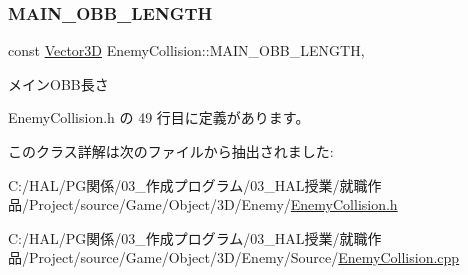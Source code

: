 \subsubsection{\texorpdfstring{M\+A\+I\+N\+\_\+\+O\+B\+B\+\_\+\+L\+E\+N\+G\+TH}{MAIN\_OBB\_LENGTH}}
{\footnotesize\ttfamily const \mbox{\hyperlink{class_vector3_d}{Vector3D}} Enemy\+Collision\+::\+M\+A\+I\+N\+\_\+\+O\+B\+B\+\_\+\+L\+E\+N\+G\+TH\hspace{0.3cm}{\ttfamily [static]}, {\ttfamily [private]}}



メイン\+O\+B\+B長さ 



 Enemy\+Collision.\+h の 49 行目に定義があります。



このクラス詳解は次のファイルから抽出されました\+:\begin{DoxyCompactItemize}
\item 
C\+:/\+H\+A\+L/\+P\+G関係/03\+\_\+作成プログラム/03\+\_\+\+H\+A\+L授業/就職作品/\+Project/source/\+Game/\+Object/3\+D/\+Enemy/\mbox{\hyperlink{_enemy_collision_8h}{Enemy\+Collision.\+h}}\item 
C\+:/\+H\+A\+L/\+P\+G関係/03\+\_\+作成プログラム/03\+\_\+\+H\+A\+L授業/就職作品/\+Project/source/\+Game/\+Object/3\+D/\+Enemy/\+Source/\mbox{\hyperlink{_enemy_collision_8cpp}{Enemy\+Collision.\+cpp}}\end{DoxyCompactItemize}
